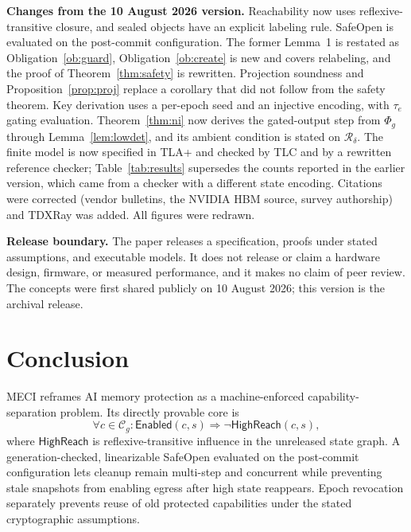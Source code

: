 \documentclass[11pt,letterpaper]{article}
\theoremstyle{plain}
\theoremstyle{definition}
\newcommand{\HR}{\mathsf{HighReach}}
\newcommand{\En}{\mathsf{Enabled}}
\newcommand{\Cg}{\mathcal{C}_g}
\newcommand{\Rd}{\mathrel{\mathcal{R}_\delta}}
\begin{document}
\textbf{Changes from the 10 August 2026 version.} Reachability now uses reflexive-transitive closure, and sealed objects have an explicit labeling rule. SafeOpen is evaluated on the post-commit configuration. The former Lemma~1 is restated as Obligation~\ref{ob:guard}, Obligation~\ref{ob:create} is new and covers relabeling, and the proof of Theorem~\ref{thm:safety} is rewritten. Projection soundness and Proposition~\ref{prop:proj} replace a corollary that did not follow from the safety theorem. Key derivation uses a per-epoch seed and an injective encoding, with $\tau_e$ gating evaluation. Theorem~\ref{thm:ni} now derives the gated-output step from $\Phi_g$ through Lemma~\ref{lem:lowdet}, and its ambient condition is stated on $\Rd$. The finite model is now specified in TLA+ and checked by TLC and by a rewritten reference checker; Table~\ref{tab:results} supersedes the counts reported in the earlier version, which came from a checker with a different state encoding. Citations were corrected (vendor bulletins, the NVIDIA HBM source, survey authorship) and TDXRay was added. All figures were redrawn.

\textbf{Release boundary.} The paper releases a specification, proofs under stated assumptions, and executable models. It does not release or claim a hardware design, firmware, or measured performance, and it makes no claim of peer review. The concepts were first shared publicly on 10 August 2026; this version is the archival release.

\section{Conclusion}

MECI reframes AI memory protection as a machine-enforced capability-separation problem. Its directly provable core is
\begin{equation}
\forall c \in \Cg : \En(c,s) \Rightarrow \neg\HR(c,s),
\end{equation}
where $\HR$ is reflexive-transitive influence in the unreleased state graph. A generation-checked, linearizable SafeOpen evaluated on the post-commit configuration lets cleanup remain multi-step and concurrent while preventing stale snapshots from enabling egress after high state reappears. Epoch revocation separately prevents reuse of old protected capabilities under the stated cryptographic assumptions.
\end{document}
